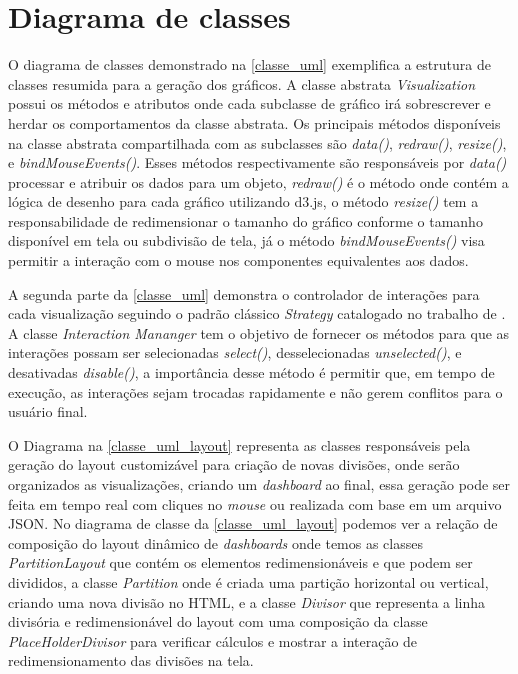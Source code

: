 \documentclass[
	12pt,				%
	openright,			%
	oneside,			%
	a4paper,			%
	english,			%
	brazil				%
	]{abntex2}
\begin{document}
\section{Diagrama de classes}
O diagrama de classes demonstrado na \autoref{classe_uml} exemplifica a estrutura de classes resumida para a geração dos gráficos. A classe abstrata \textit{Visualization}  possui os métodos e atributos onde cada subclasse de gráfico irá sobrescrever e herdar os comportamentos da classe abstrata. Os principais métodos disponíveis na classe abstrata compartilhada com as subclasses são  \textit{data()},  \textit{redraw()},  \textit{resize()}, e \textit{bindMouseEvents()}. Esses métodos respectivamente são responsáveis por \textit{data()} processar e atribuir os dados para um objeto, \textit{redraw()} é o método onde contém a lógica de desenho para cada gráfico utilizando d3.js, o método \textit{resize()} tem a responsabilidade de redimensionar o tamanho do gráfico conforme o tamanho disponível em tela ou subdivisão de tela, já o método \textit{bindMouseEvents()} visa permitir a interação com o mouse nos componentes equivalentes aos dados.

A segunda parte da \autoref{classe_uml} demonstra o controlador de interações para cada visualização seguindo o padrão clássico \textit{Strategy} catalogado no trabalho de \cite{gamma1995design}. A classe \textit{Interaction Mananger} tem o objetivo de fornecer os métodos para que as interações possam ser selecionadas \textit{select()}, desselecionadas \textit{unselected()}, e desativadas \textit{disable()}, a importância desse método é permitir que, em tempo de execução, as interações sejam trocadas rapidamente e não gerem conflitos para o usuário final.

O Diagrama na \autoref{classe_uml_layout}  representa as classes responsáveis pela geração do layout customizável para criação de novas divisões, onde serão organizados as visualizações, criando um \textit{dashboard} ao final, essa geração pode ser feita em tempo real com cliques no \textit{mouse} ou realizada com base em um arquivo JSON. No diagrama de classe da \autoref{classe_uml_layout} podemos ver a relação de composição do layout dinâmico de \textit{dashboards} onde temos as classes \textit{PartitionLayout} que contém os elementos redimensionáveis e que podem ser divididos, a classe \textit{Partition} onde é criada uma partição horizontal ou vertical, criando uma nova divisão no HTML, e a classe \textit{Divisor} que representa a linha divisória e redimensionável do layout com uma composição da classe \textit{PlaceHolderDivisor} para verificar cálculos e mostrar a interação de redimensionamento das divisões na tela.
\end{document}
